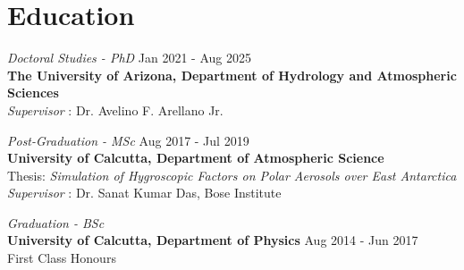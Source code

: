 \documentclass[margin,line]{resume}
\begin{document}
\begin{resume}
{		}
		
		\vspace*{-3mm}
		
		
		
		\section{\mysidestyle \textbf{\textcolor{sep}{Education}}}
		
		\emph{Doctoral Studies - PhD} \hfill Jan 2021 - Aug 2025\\
		\textbf{The University of Arizona, Department of Hydrology and Atmospheric Sciences} \\
		\textit{Supervisor} : Dr. Avelino F. Arellano Jr.
		
		\emph{Post-Graduation - MSc} \hfill  Aug 2017 - Jul 2019\\
		\textbf{University of Calcutta, Department of Atmospheric Science} \\
		\footnotesize
		\normalsize
		Thesis: \emph{Simulation of Hygroscopic Factors on Polar Aerosols over East Antarctica} \\
		\textit{Supervisor} : Dr. Sanat Kumar Das, Bose Institute
		
		\emph{Graduation - BSc}\\
		\textbf{University of Calcutta, Department of Physics}	\hfill Aug 2014 - Jun 2017\\
		First Class Honours 
		
		\vspace*{-3mm}
		

\end{resume}
\end{document}
